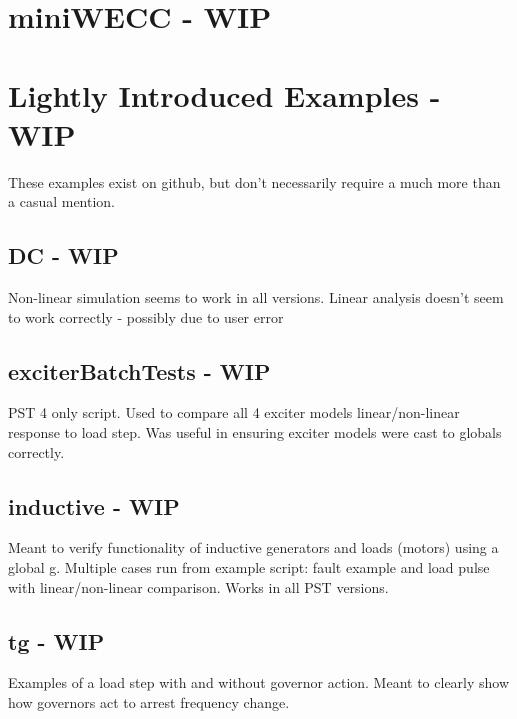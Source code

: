 



\pagebreak


\pagebreak
\section{miniWECC - WIP}

\pagebreak


\pagebreak


\pagebreak


\pagebreak
\section{Lightly Introduced Examples - WIP}
These examples exist on github, but don't necessarily require a much more than a casual mention.
\subsection{DC - WIP}
Non-linear simulation seems to work in all versions.
Linear analysis doesn't seem to work correctly - possibly due to user error

\subsection{exciterBatchTests - WIP}
PST 4 only script.
Used to compare all 4 exciter models linear/non-linear response to load step.
Was useful in ensuring exciter models were cast to globals correctly.

\subsection{inductive - WIP}
Meant to verify functionality of inductive generators and loads (motors) using a global g.
Multiple cases run from example script: fault example and load pulse with linear/non-linear comparison.
Works in all PST versions.

\subsection{tg - WIP}
Examples of a load step with and without governor action.
Meant to clearly show how governors act to arrest frequency change.

